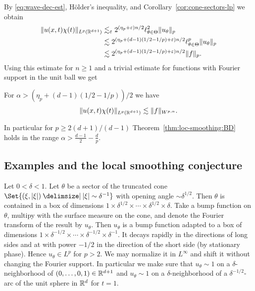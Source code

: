 By \eqref{eq:wave-dec-est}, H\"older's inequality, and Corollary~\ref{cor:cone-sectors-lp} we obtain
\begin{align*}
\lVert u(x,t) \chi(t)\rVert_{L^{p}(\mathbb{R}^{d+1})}
&\lesssim_{\varepsilon}
2^{(\eta_{p}+\varepsilon)n/2} \ell^{2}_{\theta\in\Theta} \lVert u_{\theta}\rVert_{p}\\
&\lesssim
2^{(\eta_{p}+(d-1)(1/2-1/p)+\varepsilon)n/2} \ell^{p}_{\theta\in\Theta} \lVert u_{\theta}\rVert_{p}\\
&\lesssim
2^{(\eta_{p}+(d-1)(1/2-1/p)+\varepsilon)n/2} \lVert f\rVert_{p}.
\end{align*}
Using this estimate for $n \geq 1$ and a trivial estimate for functions with Fourier support in the unit ball we get
\begin{theorem}
\label{thm:loc-smoothing:BD}
For $\alpha > (\eta_{p}+(d-1)(1/2-1/p))/2$ we have
\begin{equation}
\label{eq:loc-smoothing}
\lVert u(x,t) \chi(t)\rVert_{L^{p}(\mathbb{R}^{d+1})}
\lesssim
\lVert f\rVert_{W^{p,\alpha}}.
\end{equation}
\end{theorem}
In particular for $p \geq 2(d+1)/(d-1)$ Theorem~\ref{thm:loc-smoothing:BD} holds in the range $\alpha > \frac{d-1}{2} - \frac{d}{p}$.

\subsection{Examples and the local smoothing conjecture}
Let $0 < \delta < 1$.
Let $\theta$ be a sector of the truncated cone $\Set{ (\xi,\abs{\xi}) \given \abs{\xi} \sim \delta^{-1} }$ with opening angle $\sim \delta^{1/2}$.
Then $\theta$ is contained in a box of dimensions $1 \times \delta^{1/2} \times \dotsm \times \delta^{1/2} \times \delta$.
Take a bump function on $\theta$, multipy with the surface measure on the cone, and denote the Fourier transform of the result by $u_{\theta}$.
Then $u_{\theta}$ is a bump function adapted to a box of dimensions $1 \times \delta^{-1/2} \times \dotsm \times \delta^{-1/2} \times \delta^{-1}$.
It decays rapidly in the directions of long sides and at with power $-1/2$ in the direction of the short side (by stationary phase).
Hence $u_{\theta} \in L^{p}$ for $p>2$.
We may normalize it in $L^{\infty}$ and shift it without changing the Fourier support.
In particular we make sure that $u_{\theta} \sim 1$ on a $\delta$-neighborhood of $(0,\dotsc,0,1) \in \mathbb{R}^{d+1}$ and $u_{\theta} \sim 1$ on a $\delta$-neighborhood of a $\delta^{-1/2}$-arc of the unit sphere in $\mathbb{R}^{d}$ for $t=1$.

